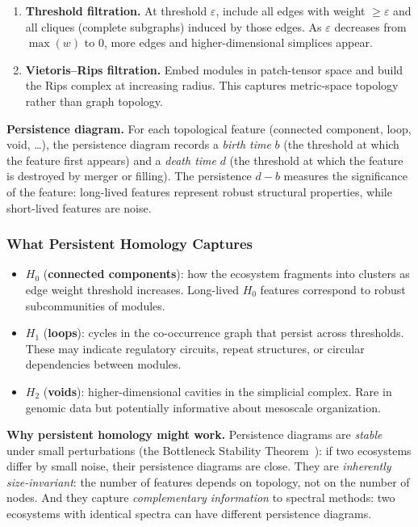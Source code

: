 \documentclass{../yalumba}
\begin{document}
\begin{enumerate}
  \item \textbf{Threshold filtration.}  At threshold $\varepsilon$,
    include all edges with weight $\geq \varepsilon$ and all cliques
    (complete subgraphs) induced by those edges.  As $\varepsilon$
    decreases from $\max(w)$ to $0$, more edges and higher-dimensional
    simplices appear.

  \item \textbf{Vietoris--Rips filtration.}  Embed modules in
    patch-tensor space and build the Rips complex at increasing
    radius.  This captures metric-space topology rather than graph
    topology.
\end{enumerate}

\begin{definition}
\textbf{Persistence diagram.}  For each topological feature (connected
component, loop, void, \ldots), the persistence diagram records a
\emph{birth time} $b$ (the threshold at which the feature first appears)
and a \emph{death time} $d$ (the threshold at which the feature is
destroyed by merger or filling).  The persistence $d - b$ measures the
significance of the feature: long-lived features represent robust
structural properties, while short-lived features are noise.
\end{definition}

\subsubsection{What Persistent Homology Captures}

\begin{itemize}
  \item $H_0$ (\textbf{connected components}): how the ecosystem
    fragments into clusters as edge weight threshold increases.
    Long-lived $H_0$ features correspond to robust subcommunities of
    modules.
  \item $H_1$ (\textbf{loops}): cycles in the co-occurrence graph that
    persist across thresholds.  These may indicate regulatory circuits,
    repeat structures, or circular dependencies between modules.
  \item $H_2$ (\textbf{voids}): higher-dimensional cavities in the
    simplicial complex.  Rare in genomic data but potentially informative
    about mesoscale organization.
\end{itemize}

\begin{keyfinding}
\textbf{Why persistent homology might work.}  Persistence diagrams are
\emph{stable} under small perturbations (the Bottleneck Stability
Theorem~\cite{edelsbrunner2010computational}): if two ecosystems differ
by small noise, their persistence diagrams are close.  They are
\emph{inherently size-invariant}: the number of features depends on
topology, not on the number of nodes.  And they capture
\emph{complementary information} to spectral methods: two ecosystems
with identical spectra can have different persistence diagrams.
\end{keyfinding}
\end{document}

